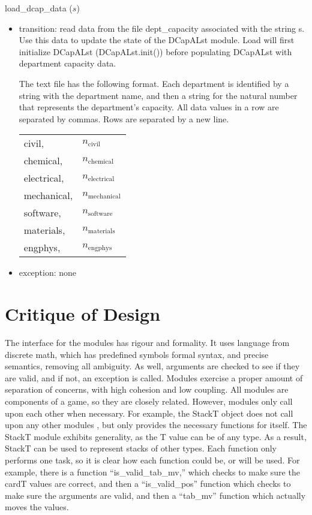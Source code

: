 \documentclass[12pt]{article}
\begin{document}
\noindent load\_dcap\_data ($s$)
\begin{itemize}
\item transition: read data from the file dept\_capacity associated with the string s.
  Use this data to update the state of the DCapALst module.  Load will first
  initialize DCapALst (DCapALst.init()) before populating DCapALst with
  department capacity data.

  The text file has the following format.  Each department is identified by a
  string with the department name, and then a string for the natural number that
  represents the department's capacity.  All data values in a row are
  separated by commas.  Rows are separated by a new line.

  \begin{tabular}{ll}
    civil, & $n_\text{civil}$\\
    chemical, & $n_\text{chemical}$\\
    electrical, & $n_\text{electrical}$\\
    mechanical, & $n_\text{mechanical}$\\
    software, & $n_\text{software}$\\
    materials, & $n_\text{materials}$\\
    engphys, & $n_\text{engphys}$\\
  \end{tabular}

\item exception: none
\end{itemize}

\section*{Critique of Design}

The interface for the modules has rigour and formality. It uses language from discrete math, which has predefined symbols formal syntax, and precise semantics, removing all ambiguity. As well, arguments are checked to see if they are valid, and if not, an exception is called. Modules exercise a proper amount of separation of concerns, with high cohesion and low coupling. All modules are components of a game, so they are closely related. However, modules only call upon each other when necessary. For example, the StackT object does not call upon any other modules , but only provides the necessary functions for itself. The StackT module exhibits generality, as the T value can be of any type. As a result, StackT can be used to represent stacks of other types. Each function only performs one task, so it is clear how each function could be, or will be used. For example, there is a function ``is\_valid\_tab\_mv,'' which checks to make sure the cardT values are correct, and then a ``is\_valid\_pos'' function which checks to make sure the arguments are valid, and then a ``tab\_mv'' function which actually moves the values. \\
\end{document}
